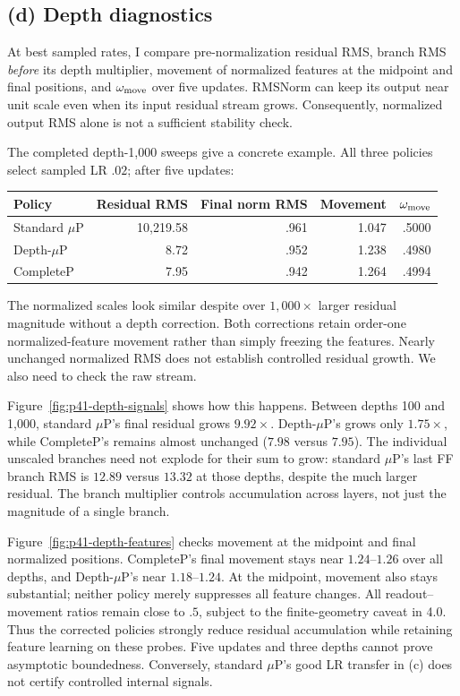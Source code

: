 \documentclass{article}
\begin{document}
\subsection{(d) Depth diagnostics}

At best sampled rates, I compare pre-normalization residual RMS, branch
RMS \emph{before} its depth multiplier, movement of normalized features
at the midpoint and final positions, and $\omega_{\rm move}$ over five updates.
RMSNorm can keep its output near unit scale even when its input residual
stream grows. Consequently, normalized output RMS alone is not a
sufficient stability check.

The completed depth-1,000 sweeps give a concrete example. All three
policies select sampled LR $.02$; after five updates:
\begin{center}
\begin{tabular}{lrrrr}
\toprule
Policy & Residual RMS & Final norm RMS & Movement & $\omega_{\rm move}$ \\
\midrule
Standard $\mu$P & 10,219.58 & .961 & 1.047 & .5000 \\
Depth-$\mu$P & 8.72 & .952 & 1.238 & .4980 \\
CompleteP & 7.95 & .942 & 1.264 & .4994 \\
\bottomrule
\end{tabular}
\end{center}
The normalized scales look similar despite over $1{,}000\times$ larger
residual magnitude without a depth correction. Both corrections retain
order-one normalized-feature movement rather than simply freezing the
features. Nearly unchanged normalized RMS does not establish controlled
residual growth. We also need to check the raw stream.

Figure~\ref{fig:p41-depth-signals} shows how this happens. Between depths
100 and 1,000, standard $\mu$P's final residual grows $9.92\times$.
Depth-$\mu$P's grows only $1.75\times$, while CompleteP's remains almost
unchanged ($7.98$ versus $7.95$). The individual unscaled branches need
not explode for their sum to grow: standard $\mu$P's last FF branch RMS
is $12.89$ versus $13.32$ at those depths, despite the much larger
residual. The branch multiplier controls accumulation across layers,
not just the magnitude of a single branch.

Figure~\ref{fig:p41-depth-features} checks movement at the midpoint and
final normalized positions. CompleteP's final movement stays near
$1.24$--$1.26$ over all depths, and Depth-$\mu$P's near $1.18$--$1.24$.
At the midpoint, movement also stays substantial; neither policy merely
suppresses all feature changes. All readout--movement ratios remain close
to $.5$, subject to the finite-geometry caveat in 4.0.
Thus the corrected policies strongly reduce residual accumulation while
retaining feature learning on these probes. Five updates and three depths
cannot prove asymptotic boundedness. Conversely, standard $\mu$P's good
LR transfer in (c) does not certify controlled internal signals.
\end{document}
